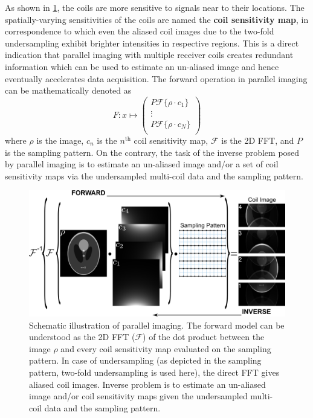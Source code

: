 As shown in \cref{Fig:mri-pi}, the coils are more sensitive to signals near to their locations. The spatially-varying sensitivities of the coils are named the \textbf{coil sensitivity map}, in correspondence to which even the aliased coil images due to the two-fold undersampling exhibit brighter intensities in respective regions. This is a direct indication that parallel imaging with multiple receiver coils creates redundant information which can be used to estimate an un-aliased image and hence eventually accelerates data acquisition. The forward operation in parallel imaging can be mathematically denoted as
\begin{equation} \label{Equ:mri-pi-forward}
  F: x \mapsto \left( \begin{array}{c}
    P \mathcal{F} \{ \rho \cdot c_1 \} \\
    \vdots \\
    P \mathcal{F} \{ \rho \cdot c_N \} \\
  \end{array} \right)
\end{equation}
where $\rho$ is the image, $c_n$ is the $n^{\text{th}}$ coil sensitivity map, $\mathcal{F}$ is the 2D FFT, and $P$ is the sampling pattern. On the contrary, the task of the inverse problem posed by parallel imaging is to estimate an un-aliased image and/or a set of coil sensitivity maps via the undersampled multi-coil data and the sampling pattern.
\begin{figure}[tb]
  \centering
  \includegraphics[width = 1.0\textwidth]{fig/mri-pi.png}
  \caption{Schematic illustration of parallel imaging. The forward model can be understood as the 2D FFT ($\mathcal{F}$) of the dot product between the image $\rho$ and every coil sensitivity map evaluated on the sampling pattern. In case of undersampling (as depicted in the sampling pattern, two-fold undersampling is used here), the direct FFT gives aliased coil images. Inverse problem is to estimate an un-aliased image and/or coil sensitivity maps given the undersampled multi-coil data and the sampling pattern.} \label{Fig:mri-pi}
\end{figure}

